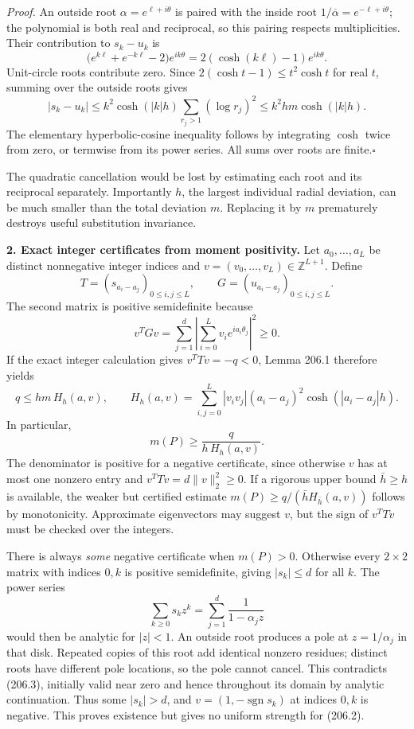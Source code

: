 \documentclass[11pt,a4paper]{article}
\newcommand{\Z}{\mathbb{Z}}
\begin{document}
\emph{Proof.}
An outside root $\alpha=e^{\ell+i\theta}$ is paired with the inside
root $1/\overline\alpha=e^{-\ell+i\theta}$; the polynomial is both
real and reciprocal, so this pairing respects multiplicities. Their
contribution to $s_k-u_k$ is
\[
 \bigl(e^{k\ell}+e^{-k\ell}-2\bigr)e^{ik\theta}
 =2(\cosh(k\ell)-1)e^{ik\theta}.
\]
Unit-circle roots contribute zero. Since
$2(\cosh t-1)\le t^2\cosh t$ for real $t$, summing over the outside
roots gives
\[
 |s_k-u_k|
 \le k^2\cosh(|k|h)\sum_{r_j>1}(\log r_j)^2
 \le k^2hm\cosh(|k|h).
\]
The elementary hyperbolic-cosine inequality follows by integrating
$\cosh$ twice from zero, or termwise from its power series. All sums
over roots are finite.\hfill$\square$

The quadratic cancellation would be lost by estimating each root and
its reciprocal separately. Importantly $h$, the largest individual
radial deviation, can be much smaller than the total deviation $m$.
Replacing it by $m$ prematurely destroys useful substitution invariance.

\textbf{2. Exact integer certificates from moment positivity.}
Let $a_0,\ldots,a_L$ be distinct nonnegative integer indices and
$v=(v_0,\ldots,v_L)\in\Z^{L+1}$. Define
\[
 T=(s_{a_i-a_j})_{0\le i,j\le L},\qquad
 G=(u_{a_i-a_j})_{0\le i,j\le L}.
\]
The second matrix is positive semidefinite because
\[
 v^T Gv=\sum_{j=1}^d
 \left|\sum_{i=0}^L v_i e^{ia_i\theta_j}\right|^2\ge0.
\]
If the exact integer calculation gives $v^TTv=-q<0$, Lemma 206.1
therefore yields
\[
 q\le hm\,H_h(a,v),\qquad
 H_h(a,v)=\sum_{i,j=0}^L|v_iv_j|(a_i-a_j)^2
                   \cosh(|a_i-a_j|h).
\]
In particular,
\[
 \boxed{\displaystyle m(P)\ge\frac{q}{h\,H_h(a,v)}.}
 \tag{206.2}
\]
The denominator is positive for a negative certificate, since otherwise
$v$ has at most one nonzero entry and $v^TTv=d\|v\|_2^2\ge0$.
If a rigorous upper bound $\bar h\ge h$ is available, the weaker but
certified estimate $m(P)\ge q/(\bar h H_{\bar h}(a,v))$ follows by
monotonicity. Approximate eigenvectors may suggest $v$, but the sign of
$v^TTv$ must be checked over the integers.

There is always \emph{some} negative certificate when $m(P)>0$.
Otherwise every $2\times2$ matrix with indices $0,k$ is positive
semidefinite, giving $|s_k|\le d$ for all $k$. The power series
\[
 \sum_{k\ge0}s_kz^k=\sum_{j=1}^d\frac{1}{1-\alpha_jz}
 \tag{206.3}
\]
would then be analytic for $|z|<1$. An outside root produces a pole
at $z=1/\alpha_j$ in that disk. Repeated copies of this root add
identical nonzero residues; distinct roots have different pole locations,
so the pole cannot cancel. This contradicts (206.3), initially valid
near zero and hence throughout its domain by analytic continuation.
Thus some $|s_k|>d$, and $v=(1,-\operatorname{sgn}s_k)$ at indices
$0,k$ is negative. This proves existence but gives no uniform strength
for (206.2).
\end{document}
